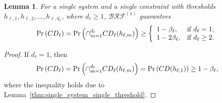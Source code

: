 \documentclass[10pt,a4paper]{amsart}
\newtheorem{lemma}{Lemma}
\begin{document}
\begin{lemma} 
\label{thm:single_system_multiple_threshold}
For a single system and a single constraint with thresholds $h_{\ell,1},h_{\ell,2},\ldots,h_{\ell, d_\ell}$, where $d_\ell\geq 1$, $\mathcal{BRF}^{(1)}$ guarantees 
\[
\Pr\left( {\rm CD}_\ell \right) = \Pr\left( \cap_{m=1}^{d_\ell}{\rm CD}_\ell(h_{\ell, m}) \right)  \ge \left\{ \begin{array}{ll} 
1 - \beta_\ell, & \mbox{if } d_\ell=1; \\
1 - 2\beta_\ell, & \mbox{if } d_\ell\ge 2.
\end{array} \right.
\]
\end{lemma}

\begin{proof}
    \renewcommand{\qedsymbol}{}
    If $d_\ell=1$, then 
\[
\Pr\left( {\rm CD}_\ell \right) = \Pr\left( \cap_{m=1}^{d_\ell}{\rm CD}_{\ell}(h_{\ell, m}) \right)  = \Pr\left( {\rm CD}(h_{\ell, 1}) \right) \ge 1 - \beta_\ell,
\]
where the inequality holds due to Lemma~\ref{thm:single_system_single_threshold}.


\end{proof}
\end{document}

